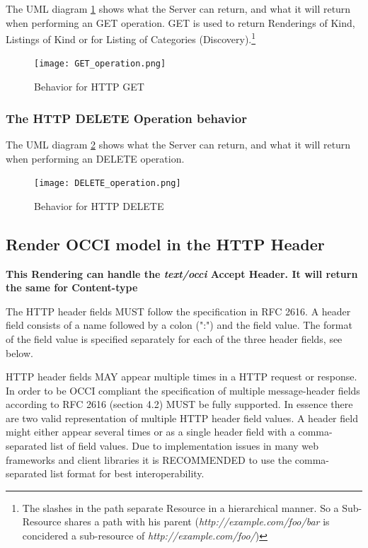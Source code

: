 \documentclass[10pt,a4paper]{article}
\begin{document}
The UML diagram \ref{fig:get_operation} shows what the Server can return, and what it will return when performing an GET operation. GET is used to return Renderings of Kind, Listings of Kind or for Listing of Categories (Discovery).\footnote{The slashes in the path separate Resource in a hierarchical manner. So a Sub-Resource shares a path with his parent (\textit{http://example.com/foo/bar} is concidered a sub-resource of \textit{http://example.com/foo/})}

\begin{figure}[!h]
	\centering
	\texttt{[image: GET\_operation.png]}
	\caption{Behavior for HTTP GET}
	\label{fig:get_operation}
\end{figure}

\newpage
\subsubsection{The HTTP DELETE Operation behavior}

The UML diagram \ref{fig:del_operation} shows what the Server can return, and what it will return when performing an DELETE operation.

\begin{figure}[!h]
	\centering
	\texttt{[image: DELETE\_operation.png]}
	\caption{Behavior for HTTP DELETE}
	\label{fig:del_operation}
\end{figure}

\subsection{Render OCCI model in the HTTP Header}
\label{sec:http_header}

\textbf{This Rendering can handle the \textit{text/occi} Accept Header. It will return the same for Content-type}

The HTTP header fields MUST follow the specification in RFC 2616. A header field consists of a name followed by a colon (":") and the field value. The format of the field value is specified separately for each of the three header fields, see below.

HTTP header fields MAY appear multiple times in a HTTP request or response. In order to be OCCI compliant the specification of multiple message-header fields according to RFC 2616 (section 4.2) MUST be fully supported. In essence there are two valid representation of multiple HTTP header field values. A header field might either appear several times or as a single header field with a comma-separated list of field values. Due to implementation issues in many web frameworks and client libraries it is RECOMMENDED to use the comma-separated list format for best interoperability.
\end{document}
